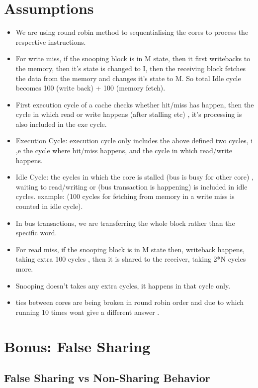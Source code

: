 \documentclass{article}
\begin{document}
\section{Assumptions}
\begin{itemize}
    \item We are using round robin method to sequentialising the cores to process the respective instructions.
    
    \item For write miss, if the snooping block is in M state, then it first writebacks to the memory, then it's state is changed to I, then the receiving block fetches the data from the memory and changes it's state to M. So total Idle cycle becomes 100 (write back) + 100 (memory fetch).
    \item First execution cycle of a cache checks whether hit/miss has happen, then the cycle in which read or write happens (after stalling etc) , it's processing is also included in the exe cycle.
    \item Execution Cycle: execution cycle only includes the above defined two cycles, i ,e the cycle where hit/miss happens, and the cycle in which read/write happens.
    \item Idle Cycle: the cycles in which the core is stalled (bus is busy for other core) ,  waiting to read/writing or (bus transaction is happening) is included in idle cycles. example: (100 cycles for fetching from memory in a write miss is counted in idle cycle).
    \item In bus transactions, we are transferring the whole block rather than the specific word.
    \item For read miss, if the snooping block is in M state then, writeback happens, taking extra 100 cycles , then it is shared to the receiver, taking 2*N cycles more.
    \item Snooping doesn't takes any extra cycles, it happens in that cycle only.
    \item ties between cores are being broken in round robin order and due to which running 10 times wont give a different answer .
\end{itemize}
\section{Bonus: False Sharing}
\subsection{False Sharing vs Non-Sharing Behavior}
\end{document}
